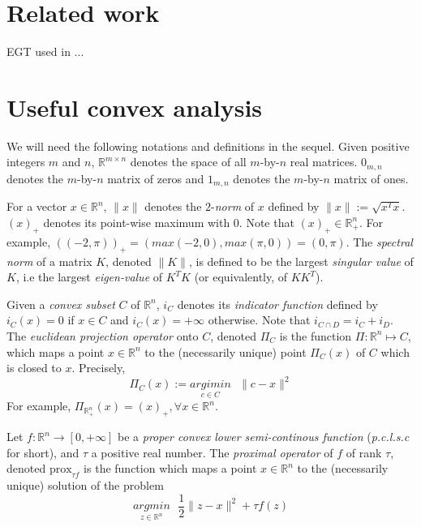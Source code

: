 \documentclass{article} %
\begin{document}

\section{Related work}
\label{sec:related_work}
EGT used in \cite{hoda2010smoothing}...

\section{Useful convex analysis}
\label{sec:notation}
We will need the following notations and definitions in the sequel. Given positive integers $m$ and $n$, $\mathbb{R}^{m \times n}$ denotes
the space of all $m$-by-$n$ real matrices. $0_{m,n}$ denotes the $m$-by-$n$ matrix of zeros and $1_{m,n}$ denotes the $m$-by-$n$ matrix of ones.

For a vector $x \in \mathbb{R}^n$, $\|x\|$ denotes the $2$-\textit{norm} of $x$ defined by $\|x\| := \sqrt{x^Tx}$.
$(x)_+$ denotes its point-wise maximum with 0. Note that $(x)_+ \in \mathbb{R}^n_+$.
For example, $((-2, \pi))_+ = (max(-2, 0), max(\pi, 0)) = (0, \pi)$. The \textit{spectral norm} of a matrix $K$,
denoted $\|K\|$, is defined to be the largest \textit{singular value} of $K$, i.e the largest \textit{eigen-value} of $K^TK$ (or equivalently, of $KK^T$).

Given a \textit{convex subset} $C$ of $\mathbb{R}^n$, $i_C$ denotes its \textit{indicator function} defined by
$i_C(x) = 0$ if $x \in C$ and $i_C(x) = +\infty$ otherwise. Note that $i_{C \cap D} = i_C + i_D$. The \textit{euclidean projection operator} onto $C$, denoted $\Pi_C$ is the function
$\Pi: \mathbb{R}^n \mapsto C$, which maps a point $x \in \mathbb{R}^n$ to the (necessarily unique) point $\Pi_C(x)$ of $C$ which is closed to $x$. Precisely,
\begin{equation}
  \Pi_C(x) := \underset{c \in C}{argimin}\text{ }\|c - x\|^2
\end{equation}
For example, $\Pi_{\mathbb{R}^n_+}(x) = (x)_+, \forall x \in \mathbb{R}^n$.

Let $f : \mathbb{R}^n \rightarrow [0, +\infty]$ be a \textit{proper convex lower semi-continous function} (\textit{p.c.l.s.c} for short), and $\tau$ a positive real number. The \textit{proximal operator} of $f$ of rank $\tau$,
denoted $\text{prox}_{\tau f}$ is the function which maps a point $x \in \mathbb{R}^n$ to the (necessarily unique) solution of the problem
\begin{equation}
  \underset{z \in \mathbb{R}^n}{argmin}\text{ }\frac{1}{2}\|z - x\|^2 + \tau f(z)
\end{equation}
\end{document}
